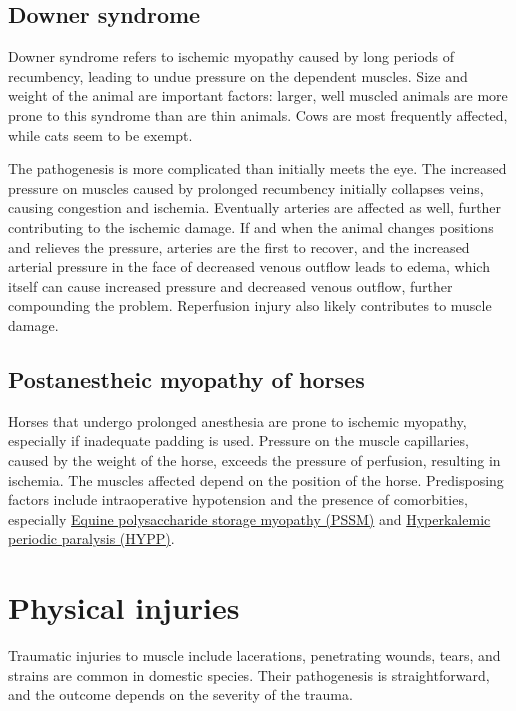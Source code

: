 \documentclass[openany]{book}
\begin{document}
\section{Downer syndrome}\label{downer-syndrome}

Downer syndrome refers to ischemic myopathy caused by long periods of
recumbency, leading to undue pressure on the dependent muscles. Size and
weight of the animal are important factors: larger, well muscled animals
are more prone to this syndrome than are thin animals. Cows are most
frequently affected, while cats seem to be exempt.

The pathogenesis is more complicated than initially meets the eye. The
increased pressure on muscles caused by prolonged recumbency initially
collapses veins, causing congestion and ischemia. Eventually arteries
are affected as well, further contributing to the ischemic damage. If
and when the animal changes positions and relieves the pressure,
arteries are the first to recover, and the increased arterial pressure
in the face of decreased venous outflow leads to edema, which itself can
cause increased pressure and decreased venous outflow, further
compounding the problem. Reperfusion injury also likely contributes to
muscle damage.

\section{Postanestheic myopathy of
horses}\label{postanestheic-myopathy-of-horses}

Horses that undergo prolonged anesthesia are prone to ischemic myopathy,
especially if inadequate padding is used. Pressure on the muscle
capillaries, caused by the weight of the horse, exceeds the pressure of
perfusion, resulting in ischemia. The muscles affected depend on the
position of the horse. Predisposing factors include intraoperative
hypotension and the presence of comorbities, especially
\protect\hyperlink{equine-polysaccharide-storage-myopathy-pssm}{Equine
polysaccharide storage myopathy (PSSM)} and
\protect\hyperlink{hyperkalemic-periodic-paralysis-hypp}{Hyperkalemic
periodic paralysis (HYPP)}.

\chapter{Physical injuries}\label{physical-injuries}

Traumatic injuries to muscle include lacerations, penetrating wounds,
tears, and strains are common in domestic species. Their pathogenesis is
straightforward, and the outcome depends on the severity of the trauma.
\end{document}
